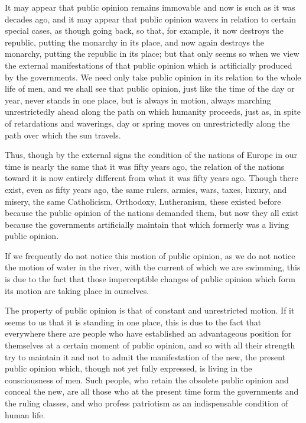 \documentclass{book}
\begin{document}
It may appear that public opinion remains immovable and now is such as it was decades ago, and it may appear that public opinion wavers in relation to certain special cases, as though going back, so that, for example, it now destroys the republic, putting the monarchy in its place, and now again destroys the monarchy, putting the republic in its place; but that only seems so when we view the external manifestations of that public opinion which is artificially produced by the governments. We need only take public opinion in its relation to the whole life of men, and we shall see that public opinion, just like the time of the day or year, never stands in one place, but is always in motion, always marching unrestrictedly ahead along the path on which humanity proceeds, just as, in spite of retardations and waverings, day or spring moves on unrestrictedly along the path over which the sun travels.

Thus, though by the external signs the condition of the nations of Europe in our time is nearly the same that it was fifty years ago, the relation of the nations toward it is now entirely different from what it was fifty years ago. Though there exist, even as fifty years ago, the same rulers, armies, wars, taxes, luxury, and misery, the same Catholicism, Orthodoxy, Lutheranism, these existed before because the public opinion of the nations demanded them, but now they all exist because the governments artificially maintain that which formerly was a living public opinion.

If we frequently do not notice this motion of public opinion, as we do not notice the motion of water in the river, with the current of which we are swimming, this is due to the fact that those imperceptible changes of public opinion which form its motion are taking place in ourselves.

The property of public opinion is that of constant and unrestricted motion. If it seems to us that it is standing in one place, this is due to the fact that everywhere there are people who have established an advantageous position for themselves at a certain moment of public opinion, and so with all their strength try to maintain it and not to admit the manifestation of the new, the present public opinion which, though not yet fully expressed, is living in the consciousness of men. Such people, who retain the obsolete public opinion and conceal the new, are all those who at the present time form the governments and the ruling classes, and who profess patriotism as an indispensable condition of human life.
\end{document}
